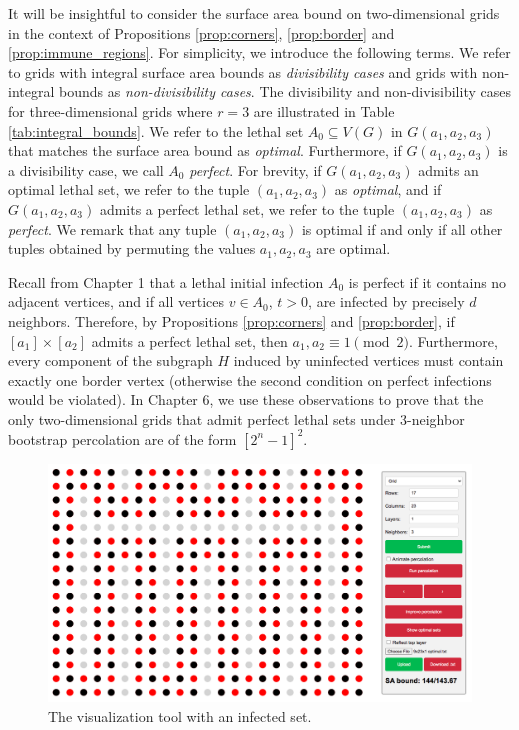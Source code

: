 It will be insightful to consider the surface area bound on two-dimensional grids in the context of Propositions \ref{prop:corners}, \ref{prop:border} and \ref{prop:immune_regions}. For simplicity, we introduce the following terms. We refer to grids with integral surface area bounds as \emph{divisibility cases} and grids with non-integral bounds as \emph{non-divisibility cases}. The divisibility and non-divisibility cases for three-dimensional grids where $r=3$ are illustrated in Table \ref{tab:integral_bounds}. We refer to the lethal set $A_0 \subseteq V(G)$ in $G(a_1,a_2,a_3)$ that matches the surface area bound as \emph{optimal}. Furthermore, if $G(a_1,a_2,a_3)$ is a divisibility case, we call $A_0$ \emph{perfect}. For brevity, if $G(a_1,a_2,a_3)$ admits an optimal lethal set, we refer to the tuple $(a_1,a_2,a_3)$ as \emph{optimal}, and if $G(a_1,a_2,a_3)$ admits a perfect lethal set, we refer to the tuple $(a_1,a_2,a_3)$ as \emph{perfect}. We remark that any tuple $(a_1, a_2, a_3)$ is optimal if and only if all other tuples obtained by permuting the values $a_1, a_2, a_3$ are optimal.

Recall from Chapter 1 that a lethal initial infection $A_0$ is perfect if it contains no adjacent vertices, and if all vertices $v \in A_{0}$, $t > 0$, are infected by precisely $d$ neighbors. Therefore, by Propositions \ref{prop:corners} and \ref{prop:border}, if  $[a_1] \times [a_2]$ admits a perfect lethal set, then $a_1, a_2 \equiv 1 \pmod 2$. Furthermore, every component of the subgraph $H$ induced by uninfected vertices must contain exactly one border vertex (otherwise the second condition on perfect infections would be violated). In Chapter 6, we use these observations to prove that the only two-dimensional grids that admit perfect lethal sets under 3-neighbor bootstrap percolation are of the form $[2^n-1]^2$.

\begin{figure}[]
\centering
\includegraphics[width=\textwidth]{figures/2/visualizer}
\caption{The visualization tool with an infected set.}
\label{fig:visualizer}
\end{figure} 

